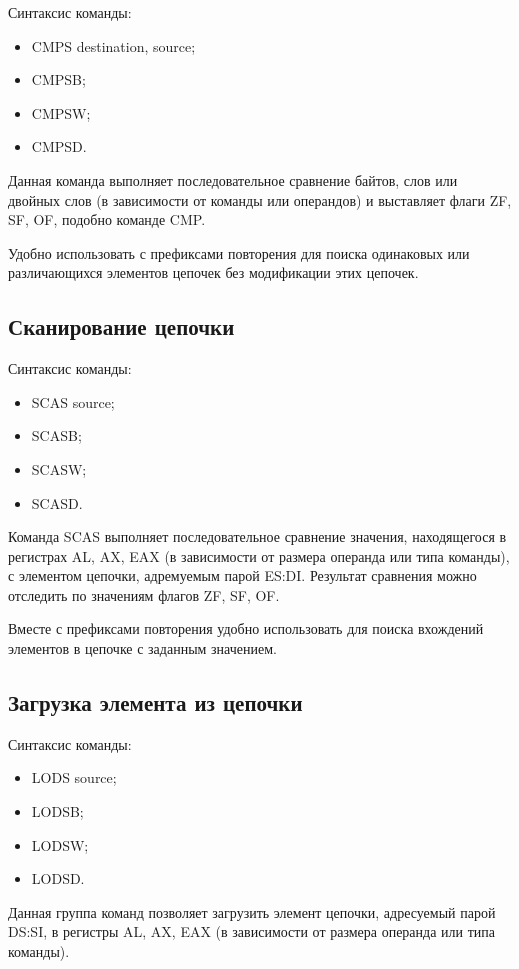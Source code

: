 Синтаксис команды:
\begin{itemize}
\item CMPS destination, source;
\item CMPSB;
\item CMPSW;
\item CMPSD.
\end{itemize}

Данная команда выполняет последовательное сравнение байтов, слов или двойных слов 
(в зависимости от команды или операндов) и выставляет флаги ZF, SF, OF,
подобно команде CMP.

Удобно использовать с префиксами повторения для поиска одинаковых или различающихся 
элементов цепочек без модификации этих цепочек.

\subsection{Сканирование цепочки}

Синтаксис команды:
\begin{itemize}
\item SCAS source;
\item SCASB;
\item SCASW;
\item SCASD.
\end{itemize}

Команда SCAS выполняет последовательное сравнение значения, находящегося
в регистрах AL, AX, EAX (в зависимости от размера операнда или типа команды), 
с элементом цепочки, адремуемым парой ES:DI.
Результат сравнения можно отследить по значениям флагов ZF, SF, OF.

Вместе с префиксами повторения удобно использовать для поиска вхождений
элементов в цепочке с заданным значением.

\subsection{Загрузка элемента из цепочки}

Синтаксис команды:
\begin{itemize}
\item LODS source;
\item LODSB;
\item LODSW;
\item LODSD.
\end{itemize}

Данная группа команд позволяет загрузить элемент цепочки, адресуемый парой DS:SI,
в регистры AL, AX, EAX (в зависимости от размера операнда или типа команды).

